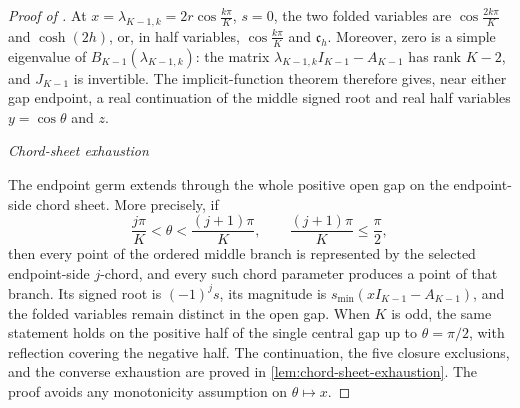 \documentclass[12pt,anonymous]{iopjournal}
\numberwithin{equation}{section}
\theoremstyle{remark}
\newcommand{\proofstage}[1]{%
  \par\medskip\noindent\textit{#1}\par\nobreak\smallskip}
\begin{document}
\begin{proof}[Proof of ]
At \(x=\lambda_{K-1,k}=2r\cos\frac{k\pi}{K}\), \(s=0\), the two
folded variables are \(\cos\frac{2k\pi}{K}\) and
\(\cosh(2h)\), or, in half variables, \(\cos\frac{k\pi}{K}\) and
\(\mathfrak c_h\).  Moreover, zero is a simple eigenvalue of
\(B_{K-1}(\lambda_{K-1,k})\): the matrix
\(\lambda_{K-1,k}I_{K-1}-A_{K-1}\) has rank \(K-2\), and \(J_{K-1}\) is
invertible.  The implicit-function theorem therefore gives, near either
gap endpoint, a real continuation of the middle signed root and real
half variables \(y=\cos\theta\) and \(z\).

\proofstage{Chord-sheet exhaustion}
The endpoint germ extends through the whole positive open gap on the
endpoint-side chord sheet.  More precisely, if
\[
 \frac{j\pi}{K}<\theta<\frac{(j+1)\pi}{K},
 \qquad
 \frac{(j+1)\pi}{K}\leq\frac{\pi}{2},
\]
then every point of the ordered middle branch is represented by the selected
endpoint-side \(j\)-chord, and every such chord parameter produces a point
of that branch.  Its signed root is \((-1)^js\), its magnitude is
\(s_{\min}(xI_{K-1}-A_{K-1})\), and the folded variables remain distinct in
the open gap.  When \(K\) is odd, the same statement holds on the positive
half of the single central gap up to \(\theta=\pi/2\), with reflection
covering the negative half.  The continuation, the five closure exclusions,
and the converse exhaustion are proved in
\cref{lem:chord-sheet-exhaustion}.  The proof avoids any monotonicity
assumption on \(\theta\mapsto x\).


\end{proof}
\end{document}
